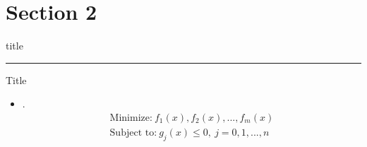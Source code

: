 \documentclass{beamer} %
\begin{document}
\section{Section 2}
    \begin{frame}[plain]
        \vfill
      \centering
      \begin{beamercolorbox}[sep=8pt,center,shadow=true,rounded=true]{title}
        \insertsectionhead\par%
        \color{orange}\noindent\rule{10cm}{1pt}
      \end{beamercolorbox}
      \vfill
  \end{frame}

\begin{frame}{Title}
\begin{itemize}
    \item \lipsum[1][1].
    \begin{align}
        \text{Minimize:} \ {f_{1}(x), f_{2}(x), ..., f_{m}(x)} \nonumber \\
        \text{Subject to:} \ g_j(x) \leq 0,\ j=0,1,...,n
    \end{align}
\end{itemize}
\end{frame}
\end{document}
